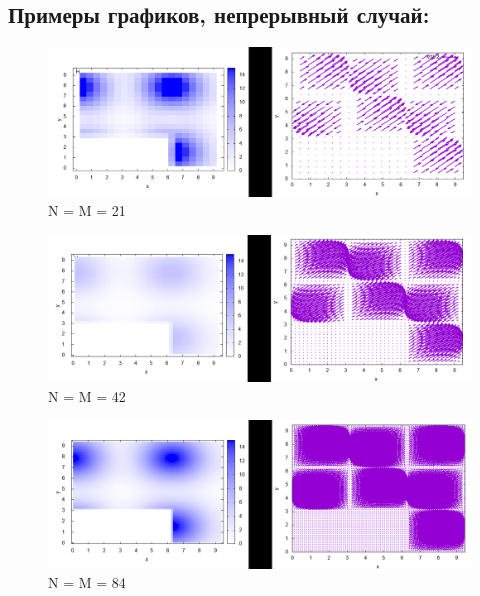 \documentclass[a4paper,11pt]{article}
\begin{document}
\subsection{Примеры графиков, непрерывный случай:}
\begin{figure}[H]
\centering
\includegraphics[width=1.0\textwidth]{cont_21.png}
\caption{N = M = 21}
\end{figure}
\begin{figure}[H]
\centering
\includegraphics[width=1.0\textwidth]{cont_42.png}
\caption{N = M = 42}
\end{figure}
\begin{figure}[H]
\centering
\includegraphics[width=1.0\textwidth]{cont_84.png}
\caption{N = M = 84}
\end{figure}
\end{document}
